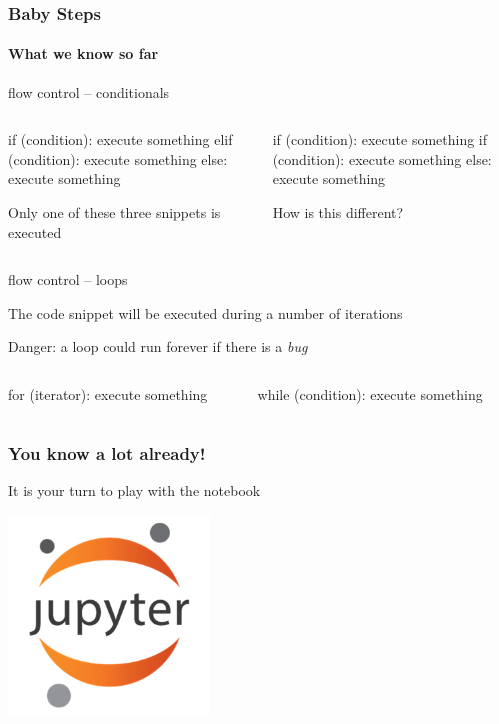 \documentclass[xcolor=x11names,handout]{beamer}
\begin{document}
\begin{frame}[fragile]
\frametitle{Baby Steps}
\framesubtitle{What we know so far}

\alert{flow control -- conditionals}

\begin{columns}
\begin{column}{0.4\textwidth}
\begin{python}
if (condition):
	execute something
elif (condition): 
	execute something
else: 
	execute something
\end{python}

Only \alert{one} of these three snippets is executed

\end{column}				\pause 

\begin{column}{0.4\textwidth}

\begin{python}
if (condition):
 	execute something
if (condition): 
 	execute something
else: 
 	execute something
\end{python}
\alert{How is this different?}
\bigskip\medskip
\end{column}
\end{columns}			\pause 
\bigskip

\alert{flow control -- loops}

The code snippet will be executed during a number of iterations

\alert{Danger}: a loop could run forever if there is a \textit{bug}

\begin{columns}
\begin{column}{0.4\textwidth}
\begin{python}
for (iterator):
	execute something
\end{python}
\end{column}

\begin{column}{0.4\textwidth}
\begin{python}
while (condition):
	execute something
\end{python}
\end{column}
\end{columns}


\end{frame}
 

\begin{frame}
\frametitle{You know a lot already!}

It is your turn to play with the notebook
\bigskip

\centering
\includegraphics[width=0.4\textwidth]{img/jupyter.png}
\end{frame}

% 
% 
\end{document}
